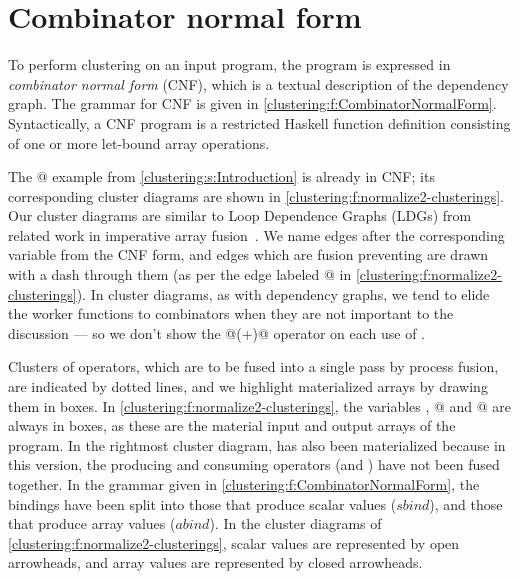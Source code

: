 

\section{Combinator normal form}
\label{clustering:s:CombinatorNormalForm}
To perform clustering on an input program, the program is expressed in \emph{combinator normal form} (CNF), which is a textual description of the dependency graph.
The grammar for CNF is given in \cref{clustering:f:CombinatorNormalForm}.
Syntactically, a CNF program is a restricted Haskell function definition consisting of one or more let-bound array operations.



The @ example from \cref{clustering:s:Introduction} is already in CNF;
its corresponding cluster diagrams are shown in \cref{clustering:f:normalize2-clusterings}.
Our cluster diagrams are similar to Loop Dependence Graphs (LDGs) from related work in imperative array fusion~\cite{gao1993collective}.
We name edges after the corresponding variable from the CNF form, and edges which are fusion preventing are drawn with a dash through them (as per the edge labeled @ in \cref{clustering:f:normalize2-clusterings}).
In cluster diagrams, as with dependency graphs, we tend to elide the worker functions to combinators when they are not important to the discussion --- so we don't show the @(+)@ operator on each use of \Hs@fold@.


Clusters of operators, which are to be fused into a single pass by process fusion, are indicated by dotted lines, and we highlight materialized arrays by drawing them in boxes.
In \cref{clustering:f:normalize2-clusterings}, the variables \Hs@xs@, @ and @ are always in boxes, as these are the material input and output arrays of the program.
In the rightmost cluster diagram, \Hs@gts@ has also been materialized because in this version, the producing and consuming operators (\Hs@filter@ and \Hs@fold@) have not been fused together.
In the grammar given in \cref{clustering:f:CombinatorNormalForm}, the bindings have been split into those that produce scalar values ($sbind$), and those that produce array values ($abind$).
In the cluster diagrams of \cref{clustering:f:normalize2-clusterings}, scalar values are represented by open arrowheads, and array values are represented by closed arrowheads.

